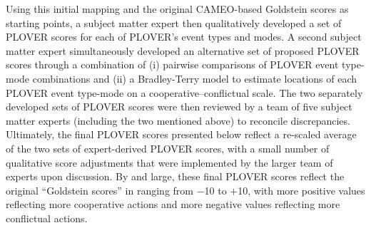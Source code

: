 \documentclass[11pt]{report}
\begin{document}
Using this initial mapping and the original CAMEO-based Goldstein scores as  starting points, a subject matter expert then qualitatively developed a set of PLOVER scores for each of PLOVER's event types and modes. A second subject matter expert simultaneously developed an alternative set of proposed PLOVER scores through a combination of (i) pairwise comparisons of PLOVER event type-mode combinations and (ii) a Bradley-Terry model to estimate locations of each PLOVER event type-mode on a cooperative--conflictual scale. The two separately developed sets of PLOVER scores were then reviewed by a team of five subject matter experts (including the two mentioned above) to reconcile discrepancies. Ultimately, the final PLOVER scores presented below reflect a re-scaled average of the two sets of expert-derived PLOVER scores, with a small number of qualitative score adjustments that were implemented by the larger team of experts upon discussion. By and large, these final PLOVER scores reflect the original ``Goldstein scores'' in ranging from $-$10 to $+$10, with more positive values reflecting more cooperative actions and more negative values reflecting more conflictual actions.


\end{document}
